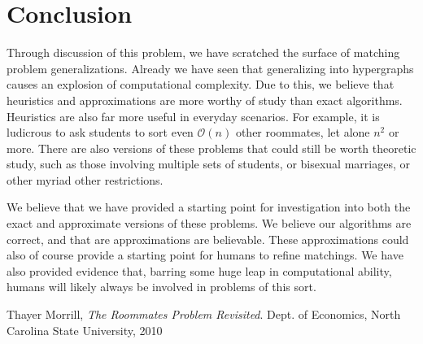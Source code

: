 \documentclass[12pt]{article}
\begin{document}
\section*{Conclusion}
Through discussion of this problem, we have scratched the surface of matching problem generalizations. Already we have seen that generalizing into hypergraphs causes an explosion of computational complexity. Due to this, we believe that heuristics and approximations are more worthy of study than exact algorithms. Heuristics are also far more useful in everyday scenarios. For example, it is ludicrous to ask students to sort even $\mathcal{O}(n)$ other roommates, let alone $n^2$ or more. There are also versions of these problems that could still be worth theoretic study, such as those involving multiple sets of students, or bisexual marriages, or other myriad other restrictions.

We believe that we have provided a starting point for investigation into both the exact and approximate versions of these problems. We believe our algorithms are correct, and that are approximations are believable. These approximations could also of course provide a starting point for humans to refine matchings. We have also provided evidence that, barring some huge leap in computational ability, humans will likely always be involved in problems of this sort. 

\begin{thebibliography}{9}
    Thayer Morrill,
    \emph{The Roommates Problem Revisited}.
    Dept. of Economics, North Carolina State University,
    2010
\end{thebibliography}
\end{document}
